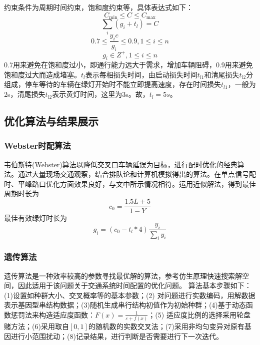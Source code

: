 约束条件为周期时间约束，饱和度约束等，具体表达式如下：
$$C_{\min } \leqslant C \leqslant C_{\max }$$
$$\sum_{i} (g_{i}+t_{l})=C$$
$$0.7 \leqslant \frac{y_{i} c}{g_{i}} \leqslant 0.9,1 \leqslant i \leqslant n$$
$$g_{i} \in Z^{+}, 1 \leqslant i \leqslant n$$
0.7用来避免在饱和度过小，即通行能力远大于需求，增加车辆阻碍，0.9用来避免饱和度过大而造成堵塞。$t_l$表示每相损失时间，由启动损失时间$t_{l1}$和清尾损失$t_{l2}$分组成，停车等待的车辆在绿灯开始时不能立即提高速度，存在时间损失$t_{l1}$，一般为2s，清尾损失$t_{l2}$表示黄灯时间，这里为3s。故，$t_l=5s$。

\subsection{优化算法与结果展示}

\subsubsection{Webster时配算法}
韦伯斯特(Webster)算法以降低交叉口车辆延误为目标，进行配时优化的经典算法。通过大量现场交通观察，结合排队论和计算机模拟得出的算法。在单点信号配时、平峰路口优化方面效果良好，与文中所示情况相符。运用近似解法，得到最佳周期时长为
\begin{equation}
    c_{0}=\frac{1.5 L+5}{1-Y}
\end{equation}
最佳有效绿灯时长为
\begin{equation}
    g_{i}=(c_{0}-t_l*4)\frac{y_i}{\sum_{i} y_{i}}
\end{equation}

\subsubsection{遗传算法}
遗传算法是一种效率较高的参数寻找最优解的算法，参考仿生原理快速搜索解空间，因此适用于该问题关于交通系统时间配置的优化问题。
算法基本步骤如下：(1)设置如种群大小、交叉概率等的基本参数；(2) 对问题进行实数编码，用解数据表示基因型串结构数据；(3)随机生成串行结构初值作为初始种群；(4)基于动态函数惩罚法来构造适应度函数：$F(x)=\frac{1}{\varepsilon+f(x)}$；(5) 适应度比例的选择采用轮盘赌方法；(6)采用取自$[0,1]$的随机数的实数交叉法；(7)采用非均匀变异对原有基因进行小范围扰动；(8)记录结果，进行判断是否需要进行下一次迭代。
\textcolor{white}{\cite{孙超2008城市单点交叉口的信号配时优化研究} \cite{顾怀中1998交叉口交通信号配时模拟退火全局优化算法}\cite{张力2014结合遗传算法的混合式蚁群单点交叉口信号配时算法}\cite{慕飞飞2015基于遗传算法的单点交叉口信号配时优化}\cite{颜艳霞2006单点交叉口信号实时配时模型及蚂蚁算法}\cite{2016You}}

